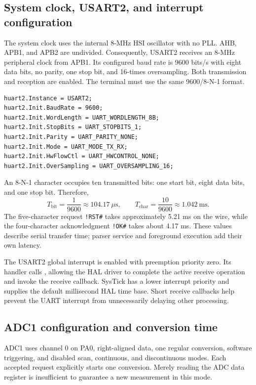\documentclass[a4paper]{article}
\newcommand{\code}[1]{\texttt{\detokenize{#1}}}
\newcommand{\topic}[1]{\subsection{#1}}
\begin{document}
\topic{System clock, USART2, and interrupt configuration}

The system clock uses the internal 8-MHz HSI oscillator with no PLL.
AHB, APB1, and APB2 are undivided. Consequently, USART2 receives an 8-MHz
peripheral clock from APB1. Its configured baud rate is 9600 bits/s with eight
data bits, no parity, one stop bit, and 16-times oversampling. Both transmission
and reception are enabled. The terminal must use the same 9600/8-N-1 format.


\par\noindent\begin{minipage}{\linewidth}
\begin{lstlisting}[caption={Essential USART2 parameters},firstnumber=1]
huart2.Instance = USART2;
huart2.Init.BaudRate = 9600;
huart2.Init.WordLength = UART_WORDLENGTH_8B;
huart2.Init.StopBits = UART_STOPBITS_1;
huart2.Init.Parity = UART_PARITY_NONE;
huart2.Init.Mode = UART_MODE_TX_RX;
huart2.Init.HwFlowCtl = UART_HWCONTROL_NONE;
huart2.Init.OverSampling = UART_OVERSAMPLING_16;
\end{lstlisting}
\end{minipage}\par

An 8-N-1 character occupies ten transmitted bits: one start bit, eight data
bits, and one stop bit. Therefore,
\[
T_{\mathrm{bit}}=\frac{1}{9600}\approx104.17\ \mu\mathrm{s},\qquad
T_{\mathrm{char}}=\frac{10}{9600}\approx1.042\ \mathrm{ms}.
\]
The five-character request \texttt{!RST\#} takes approximately 5.21 ms on the wire,
while the four-character acknowledgment \texttt{!OK\#} takes about 4.17 ms.
These values describe serial transfer time; parser service and foreground
execution add their own latency.

The USART2 global interrupt is enabled with preemption priority zero. Its
handler calls \code{HAL_UART_IRQHandler(&huart2)}, allowing the HAL driver to
complete the active receive operation and invoke the receive callback.
SysTick has a lower interrupt priority and supplies the default millisecond
HAL time base. Short receive callbacks help prevent the UART interrupt from
unnecessarily delaying other processing.


\topic{ADC1 configuration and conversion time}

ADC1 uses channel 0 on PA0, right-aligned data, one regular conversion,
software triggering, and disabled scan, continuous, and discontinuous modes.
Each accepted request explicitly starts one conversion. Merely reading the ADC
data register is insufficient to guarantee a new measurement in this mode.
\end{document}
